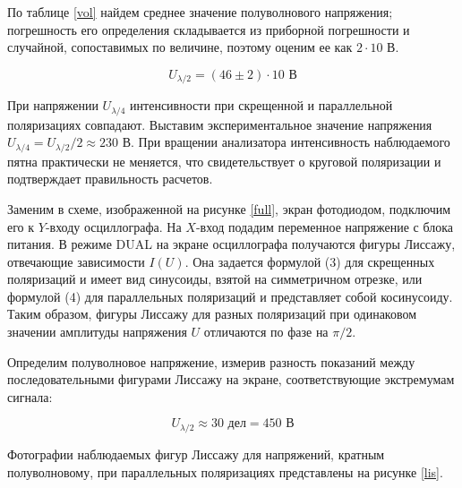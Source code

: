 	По таблице \ref{vol} найдем среднее значение полуволнового напряжения; погрешность его определения складывается из приборной погрешности и случайной, сопоставимых по величине, поэтому оценим ее как $2\cdot 10$ В. 
	
	\[ U_{\lambda/2} = (46 \pm 2) \cdot 10 \text{ В} \] 
	
	При напряжении $U_{\lambda/4}$ интенсивности при скрещенной и параллельной поляризациях совпадают. Выставим экспериментальное значение напряжения $U_{\lambda/4} = U_{\lambda/2}/2 \approx 230$ В. При вращении анализатора интенсивность наблюдаемого пятна практически не меняется, что свидетельствует о круговой поляризации и подтверждает правильность расчетов.  
	
	Заменим в схеме, изображенной на рисунке \ref{full}, экран фотодиодом, подключим его к $Y$-входу осциллографа. На $X$-вход подадим переменное напряжение с блока питания. В режиме DUAL на экране осциллографа получаются фигуры Лиссажу, отвечающие зависимости $I(U)$. Она задается формулой (3) для скрещенных поляризаций и имеет вид синусоиды, взятой на симметричном отрезке, или формулой (4) для параллельных поляризаций и представляет собой косинусоиду. Таким образом, фигуры Лиссажу для разных поляризаций при одинаковом значении амплитуды напряжения $U$ отличаются по фазе на $\pi/2$.
	
	Определим полуволновое напряжение, измерив разность показаний между последовательными фигурами Лиссажу на экране, соответствующие экстремумам сигнала: 
	
	\[ U_{\lambda/2} \approx 30 \text{ дел} = 450 \text{ В} \]
	
	Фотографии наблюдаемых фигур Лиссажу для напряжений, кратным полуволновому, при параллельных поляризациях представлены на рисунке \ref{lis}.
	
